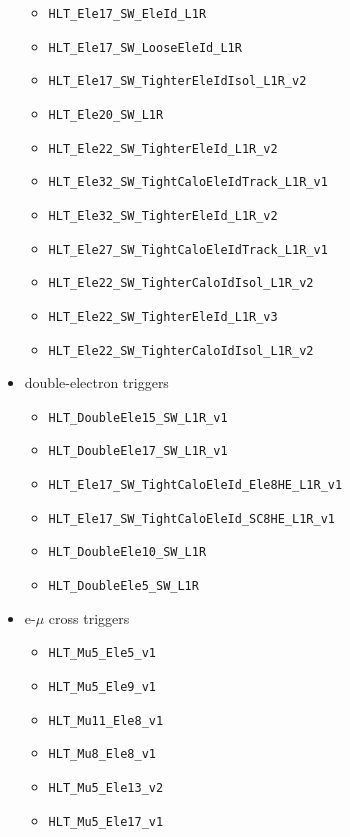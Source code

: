 \begin{itemize}
\begin{itemize}
  \item \verb=HLT_Ele17_SW_EleId_L1R=
  \item \verb=HLT_Ele17_SW_LooseEleId_L1R=
  \item \verb=HLT_Ele17_SW_TighterEleIdIsol_L1R_v2=
  \item \verb=HLT_Ele20_SW_L1R=
  \item \verb=HLT_Ele22_SW_TighterEleId_L1R_v2=
  \item \verb=HLT_Ele32_SW_TightCaloEleIdTrack_L1R_v1=
  \item \verb=HLT_Ele32_SW_TighterEleId_L1R_v2=
  \item \verb=HLT_Ele27_SW_TightCaloEleIdTrack_L1R_v1=
  \item \verb=HLT_Ele22_SW_TighterCaloIdIsol_L1R_v2=
  \item \verb=HLT_Ele22_SW_TighterEleId_L1R_v3=
  \item \verb=HLT_Ele22_SW_TighterCaloIdIsol_L1R_v2=
  \end{itemize}
\item double-electron triggers
  \begin{itemize}
  \item \verb=HLT_DoubleEle15_SW_L1R_v1=                 
  \item \verb=HLT_DoubleEle17_SW_L1R_v1=   
  \item \verb=HLT_Ele17_SW_TightCaloEleId_Ele8HE_L1R_v1=
  \item \verb=HLT_Ele17_SW_TightCaloEleId_SC8HE_L1R_v1=
  \item \verb=HLT_DoubleEle10_SW_L1R=
  \item \verb=HLT_DoubleEle5_SW_L1R=
  \end{itemize}
\item e-$\mu$ cross triggers
  \begin{itemize}
  \item \verb=HLT_Mu5_Ele5_v1=
  \item \verb=HLT_Mu5_Ele9_v1=
  \item \verb=HLT_Mu11_Ele8_v1=
  \item \verb=HLT_Mu8_Ele8_v1=
  \item \verb=HLT_Mu5_Ele13_v2=
  \item \verb=HLT_Mu5_Ele17_v1=
  \end{itemize}
\end{itemize}
